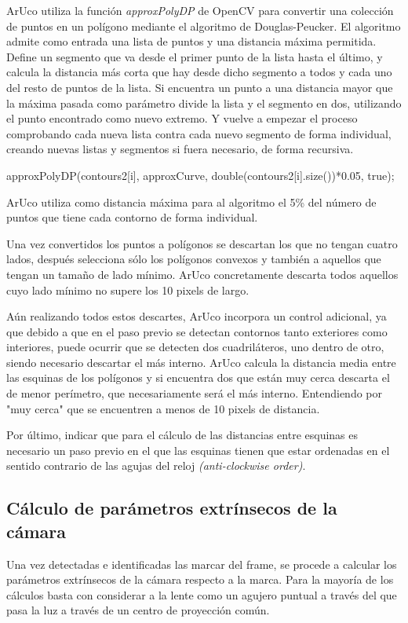ArUco utiliza la función \textit{approxPolyDP} de OpenCV para convertir una colección de puntos en un polígono mediante el algoritmo de Douglas-Peucker. El algoritmo admite como entrada una lista de puntos y una distancia máxima permitida. Define un segmento que va desde el primer punto de la lista hasta el último, y calcula la distancia más corta que hay desde dicho segmento a todos y cada uno del resto de puntos de la lista. Si encuentra un punto a una distancia mayor que la máxima pasada como parámetro divide la lista y el segmento en dos, utilizando el punto encontrado como nuevo extremo. Y vuelve a empezar el proceso comprobando cada nueva lista contra cada nuevo segmento de forma individual, creando nuevas listas y segmentos si fuera necesario, de forma recursiva.

\begin{listing}[style=C++]
approxPolyDP(contours2[i], approxCurve, double(contours2[i].size())*0.05, true);
\end{listing} 
 
ArUco utiliza como distancia máxima para al algoritmo el 5\% del número de puntos que tiene cada contorno de forma individual. 

Una vez convertidos los puntos a polígonos se descartan los que no tengan cuatro lados, después selecciona sólo los polígonos convexos y también a aquellos que tengan un tamaño de lado mínimo. ArUco concretamente descarta todos aquellos cuyo lado mínimo no supere los 10 pixels de largo. 

Aún realizando todos estos descartes, ArUco incorpora un control adicional, ya que debido a que en el paso previo se detectan contornos tanto exteriores como interiores, puede ocurrir que se detecten dos cuadriláteros, uno dentro de otro, siendo necesario descartar el más interno. ArUco calcula la distancia media entre las esquinas de los polígonos y si encuentra dos que están muy cerca descarta el de menor perímetro, que necesariamente será el más interno. Entendiendo por "muy cerca" que se encuentren a menos de 10 pixels de distancia.

Por último, indicar que para el cálculo de las distancias entre esquinas es necesario un paso previo en el que las esquinas tienen que estar ordenadas en el sentido contrario de las agujas del reloj  \textit{(anti-clockwise order)}.

\subsection{Cálculo de parámetros extrínsecos de la cámara}
Una vez detectadas e identificadas las marcar del frame, se procede a calcular los parámetros extrínsecos de la cámara respecto a la marca. Para la mayoría de los cálculos basta con considerar a la lente como un agujero puntual a través del que pasa la luz a través de un centro de proyección común. 

